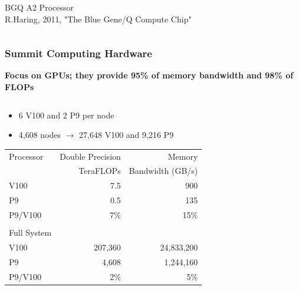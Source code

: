 \documentclass[aspectratio=169]{beamer}
\begin{document}
\begin{frame}
\begin{columns}
\begin{column}{0.3\textwidth}
      \small{BGQ A2 Processor} \\
      \tiny{R.Haring, 2011, "The Blue Gene/Q Compute Chip"}
    \end{column}
  \end{columns}
\end{frame}

\begin{frame}
  \frametitle{Summit Computing Hardware}
  \textbf{Focus on GPUs; they provide 95\% of memory bandwidth and 98\% of FLOPs}
    \begin{columns}
    \begin{column}{0.7\textwidth}
  \begin{itemize}
    \item 6 V100 and 2 P9 per node
    \item 4,608 nodes $\rightarrow$ 27,648 V100 and 9,216 P9
  \end{itemize}
  {
  \begin{table}[]
    \begin{tabular}{lrr}
      Processor   & Double Precision & Memory           \\
                  & TeraFLOPs        & Bandwidth (GB/s) \\
      V100        & 7.5              & 900              \\
      P9          & 0.5              & 135       \\
      P9/V100     & 7\%              & 15\% \\
      \\
      Full System &                  & \\
      V100        & 207,360          & 24,833,200       \\
      P9          & 4,608            & 1,244,160       \\
      P9/V100     & 2\%              & 5\%
    \end{tabular}
  \end{table}
  }
    \end{column}
    \begin{column}{0.3\textwidth}
      \begin{figure}
        \centering

\end{figure}
\end{column}
\end{columns}
\end{frame}
\end{document}
